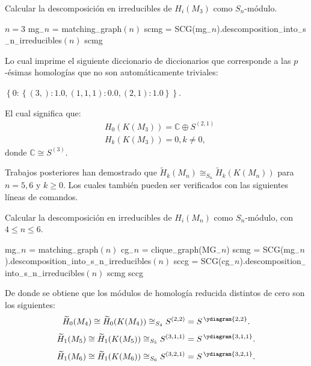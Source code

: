 \documentclass[12pt]{book}
\theoremstyle{definition}
\newcounter{in}
\begin{document}
\begin{algorithm}[H]
\caption{Calcular la descomposición en irreducibles de $H_{i}(M_3)$ como $S_n$-módulo.}
\begin{algorithmic}
\STATE $n = 3$
\STATE mg$_{-}n$ = matching$_{-}$graph$(n)$
\STATE scmg = SCG(mg$_{-}n$).descomposition$_{-}$into$_{-}$s$_{-}$n$_{-}$irreducibles$(n)$
\PRINT scmg 
\end{algorithmic}
\end{algorithm}


Lo cual imprime el siguiente diccionario de diccionarios que
corresponde a las $p$-ésimas homologías que no son automáticamente
triviales:

$ \left \{0: \left \{(3,): 1.0,(1,1,1): 0.0,(2,1): 1.0 \right \}
\right \}$.

El cual significa que:
\begin{align*}
& H_{0}(K(M_{3}))=\mathbb{C} \oplus S^{(2,1)}\\
& H_{k}(K(M_{3})) = 0, k \neq 0,
\end{align*}
donde $\mathbb{C} \cong S^{(3)}$.

Trabajos posteriores han demostrado que
$\widetilde H_{k}(M_{n})\cong_{S_n} \widetilde H_{k}(K(M_{n}))$ para
$n=5,6$ y $k\geq0$. Los cuales también pueden ser verificados con las
siguientes líneas de comandos.
\begin{algorithm}[H]
\caption{Calcular la descomposición en irreducibles de $H_{i}(M_n)$ como $S_n$-módulo, con $4 \leq n \leq 6$.}
\begin{algorithmic}
\STATE mg$_{-}n$ = matching$_{-}$graph$(n)$
\STATE cg$_{-}n$ = clique$_{-}$graph(MG$_{-}n$)
\STATE scmg = SCG(mg$_{-}n$).descomposition$_{-}$into$_{-}$s$_{-}$n$_{-}$irreducibles$(n)$
\STATE sccg = SCG(cg$_{-}n$).descomposition$_{-}$into$_{-}$s$_{-}$n$_{-}$irreducibles$(n)$
\PRINT scmg
\PRINT sccg
\ENDFOR
\end{algorithmic}
\end{algorithm}
De donde se obtiene que los módulos de homología reducida distintos de
cero son los siguientes: 
\begin{equation}
  \widetilde H_{0}(M_{4})\cong\widetilde H_{0}(K(M_{4}))\cong_{S_{4}} S^{(2,2)}= S^{\,\ydiagram{2,2}}.
\end{equation}
\begin{equation}
  \widetilde H_{1}(M_{5})\cong\widetilde H_{1}(K(M_{5}))\cong_{S_{5}} S^{(3,1,1)}=S^{\,\ydiagram{3,1,1}}.
\end{equation}
\begin{equation}
  \widetilde H_{1}(M_{6})\cong\widetilde H_{1}(K(M_{6}))\cong_{S_{6}} S^{(3,2,1)}=S^{\,\ydiagram{3,2,1}}.
\end{equation}
\end{document}
